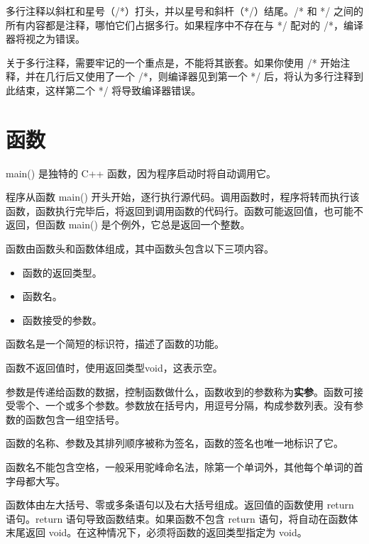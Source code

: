 多行注释以斜杠和星号（/*）打头，并以星号和斜杆（*/）结尾。/* 和 */ 之间的所有内容都是注释，哪怕它们占据多行。如果程序中不存在与 */ 配对的 /*，编译器将视之为错误。
\begin{tcolorbox}[title=警告]
    关于多行注释，需要牢记的一个重点是，不能将其嵌套。如果你使用 /* 开始注释，并在几行后又使用了一个 /*，则编译器见到第一个 */ 后，将认为多行注释到此结束，这样第二个 */ 将导致编译器错误。
\end{tcolorbox}
\section{函数}
main() 是独特的 C++ 函数，因为程序启动时将自动调用它。

程序从函数 main() 开头开始，逐行执行源代码。调用函数时，程序将转而执行该函数，函数执行完毕后，将返回到调用函数的代码行。函数可能返回值，也可能不返回，但函数 main() 是个例外，它总是返回一个整数。

函数由函数头和函数体组成，其中函数头包含以下三项内容。
\begin{itemize}
    \item 函数的返回类型。
    \item 函数名。
    \item 函数接受的参数。
\end{itemize}

函数名是一个简短的标识符，描述了函数的功能。

函数不返回值时，使用返回类型void，这表示空。

参数是传递给函数的数据，控制函数做什么，函数收到的参数称为\textbf{实参}。函数可接受零个、一个或多个参数。参数放在括号内，用逗号分隔，构成参数列表。没有参数的函数包含一组空括号。

函数的名称、参数及其排列顺序被称为签名，函数的签名也唯一地标识了它。

函数名不能包含空格，一般采用驼峰命名法，除第一个单词外，其他每个单词的首字母都大写。

函数体由左大括号、零或多条语句以及右大括号组成。返回值的函数使用 return 语句。return 语句导致函数结束。如果函数不包含 return 语句，将自动在函数体末尾返回 void。在这种情况下，必须将函数的返回类型指定为 void。